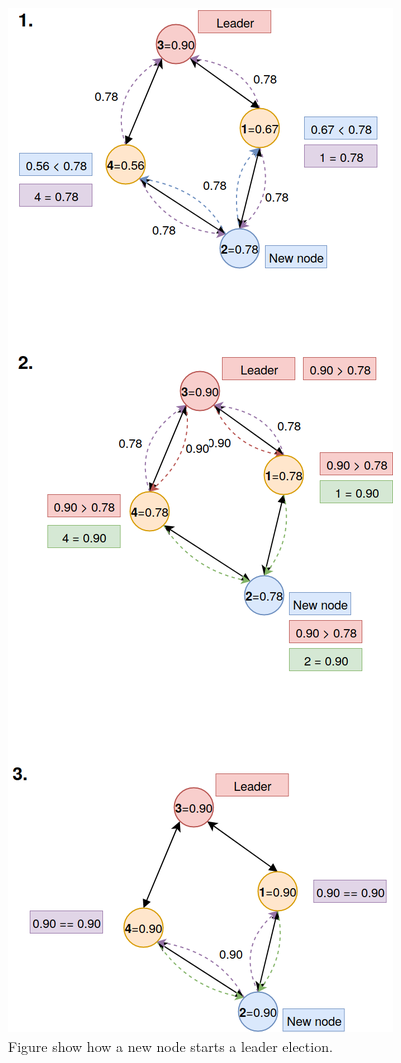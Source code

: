 \documentclass[USenglish]{uit-thesis}
\begin{document}
\begin{figure}
\centering
\includegraphics[scale=0.3]{newNodeLeaderElection.png}
\caption{Figure show how a new node starts a leader election.}
\label{fig:newNodeLeaderElection}
\end{figure}
\end{document}
